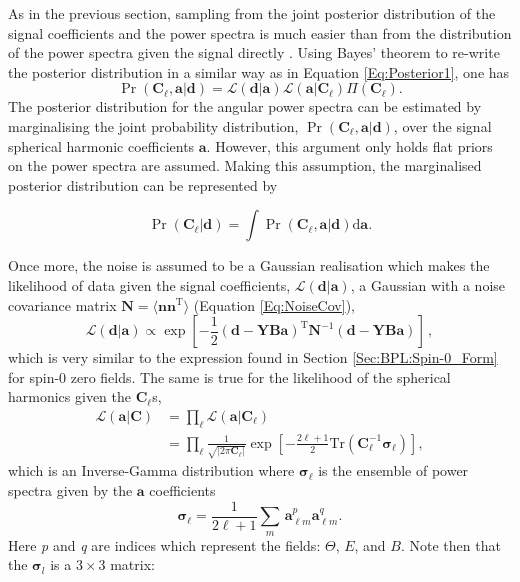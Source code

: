 \qquad As in the previous section, sampling from the joint posterior distribution of the signal coefficients and the power spectra is much easier than from the distribution of the power spectra given the signal directly \citep{Wandelt2004,Larson2007,AlmostBlackPearl2016}. Using Bayes' theorem to re-write the posterior distribution in a similar way as in Equation \ref{Eq:Posterior1}, one has
\begin{equation}
\Pr(\mathbf{C}_{\ell},\mathbf{a}|\mathbf{d})=\mathcal{L}(\mathbf{d}|\mathbf{a})\mathcal{L}(\mathbf{a}|\mathbf{C}_{\ell})\Pi(\mathbf{C}_{\ell}).
\label{Eq:FullPost}
\end{equation}
The posterior distribution for the angular power spectra can be estimated by marginalising the joint probability distribution, $\Pr(\mathbf{C}_{\ell },\mathbf{a}|\mathbf{d})$, over the signal spherical harmonic coefficients $\mathbf{a}$. However, this argument only holds flat priors on the power spectra are assumed. Making this assumption, the marginalised posterior distribution can be represented by

\begin{equation}
\Pr(\mathbf{C}_{\ell}|\mathbf{d}) = \int \Pr(\mathbf{C}_{\ell},\mathbf{a}|\mathbf{d}) \text{d}\mathbf{a} .
\end{equation}


\qquad Once more, the noise is assumed to be a Gaussian realisation which makes the likelihood of data given the signal coefficients, $\mathcal{L}(\mathbf{d}|\mathbf{a})$, a Gaussian with a noise covariance matrix $\mathbf{N}=\langle\mathbf{nn}^{\mathrm{T}} \rangle$ (Equation \ref{Eq:NoiseCov}),
\begin{equation}
\label{eqn::chCmbPol_Prda}
\mathcal{L}(\mathbf{d}|\mathbf{a}) \propto \exp \left[-\frac{1}{2}(\mathbf{d}-\mathbf{YBa})^{\mathrm{T}}\mathbf{N}^{-1}(\mathbf{d}-\mathbf{YBa}) \right]\, ,
\end{equation}
which is very similar to the expression found in Section \ref{Sec:BPL:Spin-0_Form} for spin-0 zero fields. The same is true for the likelihood of the spherical harmonics given the $\mathbf{C}_{\ell}$s,
\begin{align}
\mathcal{L}(\mathbf{a}|\mathbf{C}) & = \prod_{\ell} \mathcal{L}(\mathbf{a} | \mathbf{C}_{\ell}) \\ 
& = \prod_{\ell}\frac{1}{\sqrt{|2\pi\mathbf{C}_{\ell}|}}\exp\left[-\frac{2\ell+1}{2}\mathrm{Tr}(\mathbf{C}_{\ell}^{-1}\boldsymbol{\sigma}_{\ell})\right],
\end{align}
\noindent which is an Inverse-Gamma distribution where $\boldsymbol{\sigma}_{\ell}$ is the ensemble of power spectra given by the $\mathbf{a}$ coefficients
\begin{equation}
\boldsymbol{\sigma}_{\ell} = \frac{1}{2\ell+1}\sum_m\,\mathbf{a}^{p}_{\ell m}\mathbf{a}_{\ell m}^{q}.
\end{equation}
\noindent Here \textit{p} and \textit{q} are indices which represent the fields: $\Theta$, $E$, and $B$. Note then that the $\boldsymbol{\sigma}_l$ is a $3\times 3$ matrix:

